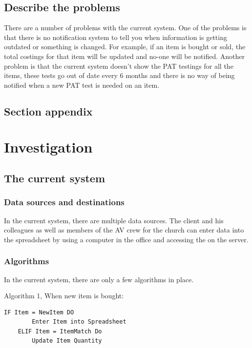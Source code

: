 \documentclass[a4paper,12pt]{report}
\begin{document}
\subsection{Describe the problems}

There are a number of problems with the current system. One of the problems is that there is no notification system to tell you when information is getting outdated or something is changed. For example, if an item is bought or sold, the total costings for that item will be updated and no-one will be notified. Another problem is that the current system doesn't show the PAT testings for all the items, these tests go out of date every 6 months and there is no way of being notified when a new PAT test is needed on an item.

\subsection{Section appendix}



\section{Investigation}

\subsection{The current system}

\subsubsection{Data sources and destinations}

In the current system, there are multiple data sources. The client and his colleagues as well as members of the AV crew for the church can enter data into the spreadsheet by using a computer in the office and accessing the on the server.

\subsubsection{Algorithms}

In the current system, there are only a few algorithms in place.
\bigskip

Algorithm 1, When new item is bought:
\begin{lstlisting}
IF Item = NewItem DO
        Enter Item into Spreadsheet
    ELIF Item = ItemMatch Do
        Update Item Quantity
\end{lstlisting}
\bigskip
\end{document}
